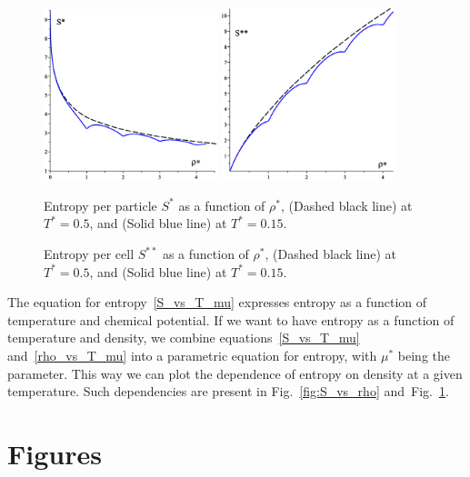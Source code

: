 \documentclass[12pt]{article}
\numberwithin{equation}{section}
\begin{document}
	\begin{figure}[htbp]
		\includegraphics[width=0.45\textwidth,angle=0]{S_vs_rho}
		\hfill
		\includegraphics[width=0.45\textwidth,angle=0]{SS_vs_rho}
		\\
		\parbox{0.45\textwidth}{\caption{\label{fig:S_vs_rho} Entropy per particle $S^{*}$ as a function of $\rho^*$, (Dashed black line) at $T^*=0.5$, and (Solid blue line) at $T^*=0.15$.}}
		\hfill
		\parbox{0.45\textwidth}{\caption{\label{fig:SS_vs_rho} Entropy per cell $S^{**}$ as a function of $\rho^*$, (Dashed black line) at $T^*=0.5$, and (Solid blue line) at $T^*=0.15$.}}
	\end{figure}
	
	The equation for entropy~\eqref{S_vs_T_mu} expresses entropy as a function of temperature and chemical potential. If we want to have entropy as a function of temperature and density, we combine equations~\eqref{S_vs_T_mu} and~\eqref{rho_vs_T_mu} into a parametric equation for entropy, with $\mu^*$ being the parameter. This way we can plot the dependence of entropy on density at a given temperature. Such dependencies are present in Fig.~\ref{fig:S_vs_rho} and~Fig.~\ref{fig:SS_vs_rho}.
	
	
	\pagebreak
	
	\section{Figures}
\end{document}
